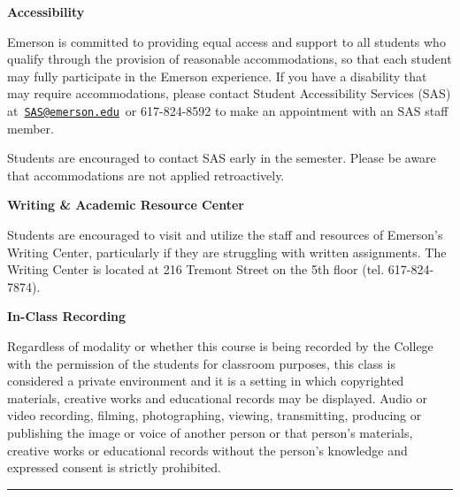 \documentclass[
  letterpaper,
  DIV=11,
  numbers=noendperiod]{scrartcl}
\begin{document}
\textbf{Accessibility}

Emerson is committed to providing equal access and support to all
students who qualify through the provision of reasonable accommodations,
so that each student may fully participate in the Emerson experience. If
you have a disability that may require accommodations, please contact
Student Accessibility Services (SAS)
at~\href{mailto:SAS@emerson.edu}{\nolinkurl{SAS@emerson.edu}}~or
617-824-8592 to make an appointment with an SAS staff member.

Students are encouraged to contact SAS early in the semester. Please be
aware that accommodations are not applied retroactively.

\textbf{Writing \& Academic Resource Center}

Students are encouraged to visit and utilize the staff and resources of
Emerson's Writing Center, particularly if they are struggling with
written assignments. The Writing Center is located at 216 Tremont Street
on the 5th floor (tel. 617-824-7874).

\textbf{In-Class Recording}

Regardless of modality or whether this course is being recorded by the
College with the permission of the students for classroom purposes, this
class is considered a private environment and it is a setting in which
copyrighted materials, creative works and educational records may be
displayed. Audio or video recording, filming, photographing, viewing,
transmitting, producing or publishing the image or voice of another
person or that person's materials, creative works or educational records
without the person's knowledge and expressed consent is strictly
prohibited.~

\begin{center}\rule{0.5\linewidth}{0.5pt}\end{center}
\end{document}
